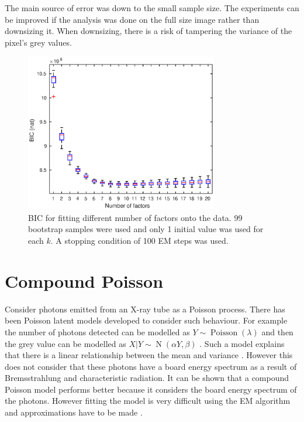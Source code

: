 \documentclass[12pt]{report}
\DeclareMathOperator{\normal}{N}
\DeclareMathOperator{\poisson}{Poisson}
\begin{document}
The main source of error was down to the small sample size. The experiments can be improved if the analysis was done on the full size image rather than downsizing it. When downsizing, there is a risk of tampering the variance of the pixel's grey values.

\begin{figure}
	\centering
	\includegraphics[width=0.75\textwidth]{figures/initial_factor_BIC_bootstrap.eps}
	\caption{BIC for fitting different number of factors onto the data. 99 bootstrap samples were used and only 1 initial value was used for each $k$. A stopping condition of 100 EM steps was used.}
	\label{fig:initial_factor_BIC_bootstrap}
\end{figure}

\section{Compound Poisson}
Consider photons emitted from an X-ray tube as a Poisson process. There has been Poisson latent models developed to consider such behaviour. For example the number of photons detected can be modelled as $Y\sim\poisson(\lambda)$ and then the grey value can be modelled as $X|Y\sim\normal(\alpha Y,\beta)$ \cite{jin2014investigating}. Such a model explains that there is a linear relationship between the mean and variance \cite{jin2014investigating}. However this does not consider that these photons have a board energy spectrum as a result of Bremsstrahlung and characteristic radiation. It can be shown that a compound Poisson model performs better \cite{whiting2006properties} because it considers the board energy spectrum of the photons. However fitting the model is very difficult using the EM algorithm and approximations have to be made \cite{xie2008x}.
\end{document}
